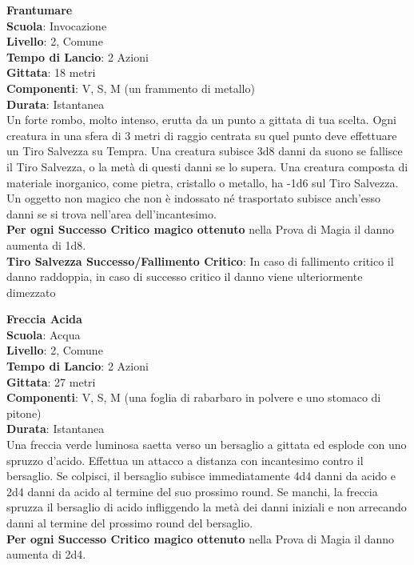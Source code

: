 \begin{multicols}{2}
\medskip\textbf{Frantumare}\\
\textbf{Scuola}: Invocazione\\
\textbf{Livello}: 2, Comune\\
\textbf{Tempo di Lancio}: 2 Azioni\\
\textbf{Gittata}: 18 metri\\
\textbf{Componenti}: V, S, M (un frammento di metallo)\\
\textbf{Durata}: Istantanea\\
Un forte rombo, molto intenso, erutta da un punto a gittata di tua scelta. Ogni creatura in una sfera di 3 metri di raggio centrata su quel punto deve effettuare un Tiro Salvezza su Tempra. Una creatura subisce 3d8 danni da suono se fallisce il Tiro Salvezza, o la metà di questi danni se lo supera. Una creatura composta di materiale inorganico, come pietra, cristallo o metallo, ha -1d6 sul Tiro Salvezza. Un oggetto non magico che non è indossato né trasportato subisce anch'esso danni se si trova nell'area dell'incantesimo.\\
\textbf{Per ogni Successo Critico magico ottenuto} nella Prova di Magia il danno aumenta di 1d8.\\
\textbf{Tiro Salvezza Successo/Fallimento Critico}: In caso di fallimento critico il danno raddoppia, in caso di successo critico il danno viene ulteriormente dimezzato

\medskip\textbf{Freccia Acida}\\
\textbf{Scuola}: Acqua\\
\textbf{Livello}: 2, Comune\\
\textbf{Tempo di Lancio}: 2 Azioni\\
\textbf{Gittata}: 27 metri\\
\textbf{Componenti}: V, S, M (una foglia di rabarbaro in polvere e uno stomaco di pitone)\\
\textbf{Durata}: Istantanea\\
Una freccia verde luminosa saetta verso un bersaglio a gittata ed esplode con uno spruzzo d'acido. Effettua un attacco a distanza con incantesimo contro il bersaglio. Se colpisci, il bersaglio subisce immediatamente 4d4 danni da acido e 2d4 danni da acido al termine del suo prossimo round. Se manchi, la freccia spruzza il bersaglio di acido infliggendo la metà dei danni iniziali e non arrecando danni al termine del prossimo round del bersaglio.\\
\textbf{Per ogni Successo Critico magico ottenuto} nella Prova di Magia il danno aumenta di 2d4.


\end{multicols}

